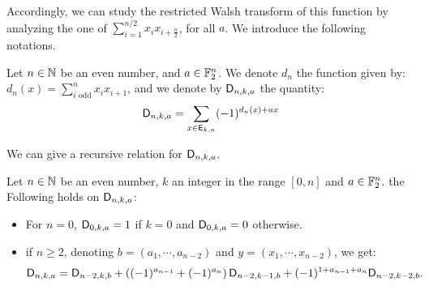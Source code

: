\documentclass[11pt]{llncs}
\begin{document}

Accordingly, we can study the restricted Walsh transform of this function by analyzing the one of $\sum_{i=1}^{n/2} x_i x_{i+\frac{n}{2}}$, for all $a$. We introduce the following notations.

\begin{definition}
Let $n\in \mathbb{N}$ be an even number, and $a\in \mathbb{F}_2^n$. We denote $d_n$ the function given by: $d_n(x)=\sum_{i \text{ odd}}^n x_i x_{i+1}$, 
and we denote by $\mathsf{D}_{n,k,a}$ the quantity:
\[\mathsf{D}_{n,k,a}= \sum_{x\in \mathsf{E}_{k,n}} (-1)^{d_n(x) +a x}\]
\end{definition}

We can give a recursive relation for $\mathsf{D}_{n,k,a}$.




\begin{proposition}\label{prop:recursiveDnka}
Let $n\in \mathbb{N}$ be an even number, $k$ an integer in the range $[0,n]$ and $a\in \mathbb{F}_2^n$. the Following holds on $\mathsf{D}_{n,k,a}$:
\begin{itemize}
	\item For $n=0$, $\mathsf{D}_{0,k,a}=1$ if $k=0$ and $\mathsf{D}_{0,k,a}=0$ otherwise.
	\item if $n\ge 2$, denoting  $b=(a_1,\cdots,a_{n-2})$ and $y=(x_1,\cdots,x_{n-2})$, we get:
	\[\mathsf{D}_{n,k,a}=\mathsf{D}_{n-2,k,b}+\left((-1)^{a_{n-1}} + (-1)^{a_{n}}\right)\mathsf{D}_{n-2,k-1,b} + (-1)^{1+a_{n-1}+a_n} \mathsf{D}_{n-2,k-2,b}.\]
\end{itemize}

	
\end{proposition}
\end{document}
